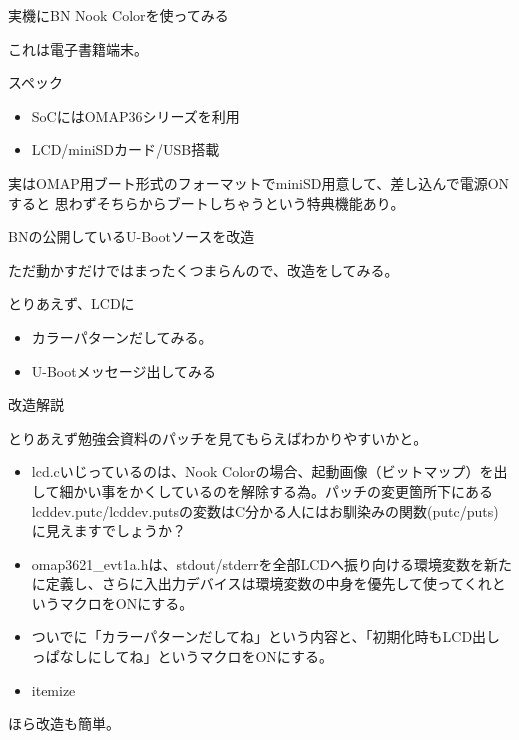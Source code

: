 \begin{frame}{実機にBN Nook Colorを使ってみる}

これは電子書籍端末。

スペック\\
\begin{itemize}
\item SoCにはOMAP36シリーズを利用
\item LCD/miniSDカード/USB搭載
\end{itemize}

実はOMAP用ブート形式のフォーマットでminiSD用意して、差し込んで電源ONすると
思わずそちらからブートしちゃうという特典機能あり。

\end{frame}

\begin{frame}{BNの公開しているU-Bootソースを改造}

ただ動かすだけではまったくつまらんので、改造をしてみる。

とりあえず、LCDに
\begin{itemize}
\item カラーパターンだしてみる。
\item U-Bootメッセージ出してみる
\end{itemize}

\end{frame}

\begin{frame}{改造解説}

とりあえず勉強会資料のパッチを見てもらえばわかりやすいかと。

\begin{itemize}
\item lcd.cいじっているのは、Nook Colorの場合、起動画像（ビットマップ）を出して細かい事をかくしているのを解除する為。パッチの変更箇所下にあるlcddev.putc/lcddev.putsの変数はC分かる人にはお馴染みの関数(putc/puts)に見えますでしょうか？
\item omap3621\_evt1a.hは、stdout/stderrを全部LCDへ振り向ける環境変数を新たに定義し、さらに入出力デバイスは環境変数の中身を優先して使ってくれというマクロをONにする。
\item ついでに「カラーパターンだしてね」という内容と、「初期化時もLCD出しっぱなしにしてね」というマクロをONにする。
\item{itemize}
\end{itemize}
ほら改造も簡単。

\end{frame}

